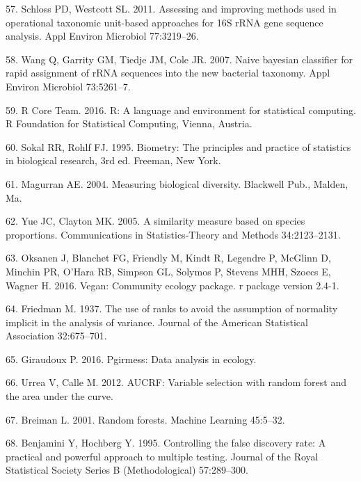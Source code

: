 \documentclass[12pt,]{article}
\begin{document}
\hypertarget{ref-schloss_OTUanalysis_2011}{}
57. Schloss PD, Westcott SL. 2011. Assessing and improving methods used
in operational taxonomic unit-based approaches for 16S rRNA gene
sequence analysis. Appl Environ Microbiol 77:3219--26.

\hypertarget{ref-wang_taxonomy_2007}{}
58. Wang Q, Garrity GM, Tiedje JM, Cole JR. 2007. Naive bayesian
classifier for rapid assignment of rRNA sequences into the new bacterial
taxonomy. Appl Environ Microbiol 73:5261--7.

\hypertarget{ref-R}{}
59. R Core Team. 2016. R: A language and environment for statistical
computing. R Foundation for Statistical Computing, Vienna, Austria.

\hypertarget{ref-sokal_biometrystats_1995}{}
60. Sokal RR, Rohlf FJ. 1995. Biometry: The principles and practice of
statistics in biological research, 3rd ed. Freeman, New York.

\hypertarget{ref-magurran_measuring_2004}{}
61. Magurran AE. 2004. Measuring biological diversity. Blackwell Pub.,
Malden, Ma.

\hypertarget{ref-yue_thetaYC_2005}{}
62. Yue JC, Clayton MK. 2005. A similarity measure based on species
proportions. Communications in Statistics-Theory and Methods
34:2123--2131.

\hypertarget{ref-oksanen_vegan_2016}{}
63. Oksanen J, Blanchet FG, Friendly M, Kindt R, Legendre P, McGlinn D,
Minchin PR, O'Hara RB, Simpson GL, Solymos P, Stevens MHH, Szoecs E,
Wagner H. 2016. Vegan: Community ecology package. r package version
2.4-1.

\hypertarget{ref-friedman_1937}{}
64. Friedman M. 1937. The use of ranks to avoid the assumption of
normality implicit in the analysis of variance. Journal of the American
Statistical Association 32:675--701.

\hypertarget{ref-pgirmess}{}
65. Giraudoux P. 2016. Pgirmess: Data analysis in ecology.

\hypertarget{ref-AUCRF}{}
66. Urrea V, Calle M. 2012. AUCRF: Variable selection with random forest
and the area under the curve.

\hypertarget{ref-breiman_rf_2001}{}
67. Breiman L. 2001. Random forests. Machine Learning 45:5--32.

\hypertarget{ref-Benjamini_Hochberg_1995}{}
68. Benjamini Y, Hochberg Y. 1995. Controlling the false discovery rate:
A practical and powerful approach to multiple testing. Journal of the
Royal Statistical Society Series B (Methodological) 57:289--300.
\end{document}
